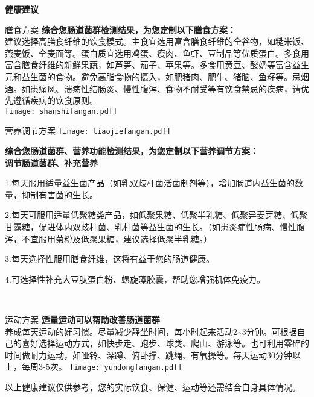 

\usepackage{graphicx}
\graphicspath{{cores/}}



\vspace*{5mm}
\setlength{\arrayrulewidth}{1pt}
\fontsize{9.3pt}{11pt}\selectfont
\color{gray2}

\centerline{\bf\sanhao 健康建议}

\vspace*{2mm}

\begin{LRaside}[.20]{膳食方案}
{\bf *综合您肠道菌群检测结果，为您定制以下膳食方案：}\\
{\indent 建议选择高膳食纤维的饮食模式。主食宜选用富含膳食纤维的全谷物，如糙米饭、燕麦饭、全麦面等。蛋白质宜选用鸡蛋、瘦肉、鱼虾、豆制品等优质蛋白。多食用富含膳食纤维的新鲜果蔬，如芦笋、茄子、苹果等。多食用黄豆、酸奶等富含益生元和益生菌的食物。避免高脂食物的摄入，如肥猪肉、肥牛、猪脑、鱼籽等。忌烟酒。如患痛风、溃疡性结肠炎、慢性腹泻、食物不耐受等有饮食禁忌的疾病，请优先遵循疾病的饮食原则。}\\
\asidebreak %
\noindent
\texttt{[image: shanshifangan.pdf]}

\end{LRaside}


\begin{LRaside}[.70]{营养调节方案}
\noindent
\texttt{[image: tiaojiefangan.pdf]}

\asidebreak %
{\bf *综合您肠道菌群、营养功能检测结果，为您定制以下营养调节方案：}\\
{\bf 调节肠道菌群、补充营养}\\{\indent 1.每天服用适量益生菌产品（如乳双歧杆菌活菌制剂等），增加肠道内益生菌的数量，抑制有害菌的生长。

2.每天可服用适量低聚糖类产品，如低聚果糖、低聚半乳糖、低聚异麦芽糖、低聚甘露糖，促进体内双歧杆菌、乳杆菌等益生菌的生长。（如患炎症性肠病、慢性腹泻，不宜服用菊粉及低聚果糖，建议选择低聚半乳糖。）

3.每天选择性服用膳食纤维，这将有益于您的肠道健康。

4.可选择性补充大豆肽蛋白粉、螺旋藻胶囊，帮助您增强机体免疫力。}\\
\end{LRaside}

\begin{LRaside}[.20]{运动方案}
{\bf *适量运动可以帮助改善肠道菌群}\\
{\indent 养成每天运动的好习惯。尽量减少静坐时间，每小时起来活动2\textasciitilde 3分钟。可根据自己的喜好选择运动方式，如快步走、跑步、球类、爬山、游泳等。也可利用零碎的时间做耐力运动，如哑铃、深蹲、俯卧撑、跳绳、有氧操等。每天运动30分钟以上，每周3-5次。}
\asidebreak %
\noindent
\texttt{[image: yundongfangan.pdf]}

\end{LRaside}

{\noindent\qihao *以上健康建议仅供参考，您的实际饮食、保健、运动等还需结合自身具体情况。}


